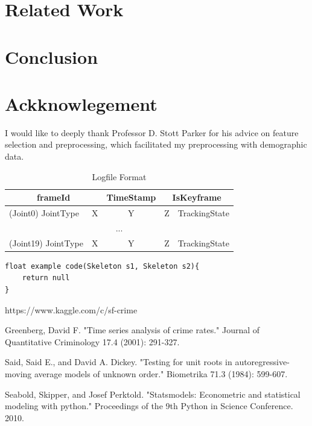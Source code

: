 \documentclass[11pt,conference]{IEEEtran}
\begin{document}
\section{Related Work}

\section{Conclusion}

\section{Ackknowlegement}
I would like to deeply thank Professor D. Stott Parker for his advice on feature selection and preprocessing, which facilitated my preprocessing with demographic data. 


\begin{table}[h]
\caption{Logfile Format}\centering
\begin{tabular}{|l|l|c|l|l|}
\hline
\multicolumn{2}{|c|}{frameId} & \multicolumn{1}{l|}{TimeStamp} & \multicolumn{2}{c|}{IsKeyframe} \\ \hline
(Joint0) JointType     & X    & Y                              & Z        & TrackingState        \\ \hline
\multicolumn{5}{|c|}{...}                                                                        \\ \hline
(Joint19) JointType    & X    & Y                              & Z        & TrackingState        \\ \hline
\end{tabular}
\end{table}

\begin{lstlisting}
float example code(Skeleton s1, Skeleton s2){ 
	return null
}
\end{lstlisting}

\begin{thebibliography}{1}

https://www.kaggle.com/c/sf-crime

Greenberg, David F. "Time series analysis of crime rates." Journal of Quantitative Criminology 17.4 (2001): 291-327.

Said, Said E., and David A. Dickey. "Testing for unit roots in autoregressive-moving average models of unknown order." Biometrika 71.3 (1984): 599-607.

Seabold, Skipper, and Josef Perktold. "Statsmodels: Econometric and statistical modeling with python." Proceedings of the 9th Python in Science Conference. 2010.

\end{thebibliography}
\end{document}
